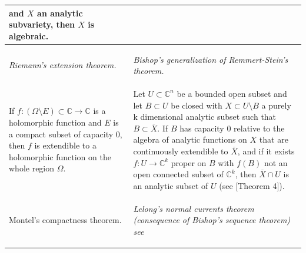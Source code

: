 \documentclass[12pt,twoside,a4paper]{report}
\newcommand{\co}{\ensuremath{\mathbb C }}
\newcommand{\con}{\ensuremath{\mathbb{C}^n}}
\newcommand{\om}{\ensuremath{\Omega}}
\begin{document}
\begin{table}[h!]
\begin{tabular}{| m{5cm} | m{5cm} |}
                                  and $X$ an analytic subvariety, then $X$ is algebraic.\\
                              \midrule
                              \begin{center}
                                  \textit{Riemann's extension theorem.}
                              \end{center}
                                  &
                              \begin{center}
                                  \textit{Bishop's generalization of Remmert-Stein's theorem.}
                              \end{center} \\
                              \midrule
                                  If $f:(\om\setminus E)\subset\co\rightarrow\co$ is a holomorphic function and
                                  $E$ is a compact subset of capacity $0$, then $f$ is extendible to a holomorphic
                                  function on the whole region $\om$.
                                          &
                                  Let $U\subset\con$ be a bounded open
                                  subset and let $B\subset U$ be closed with $X\subset U\setminus B$ a purely k
                                  dimensional analytic subset such that $B\subset\overline{X}$. If $B$ has
                                  capacity $0$ relative to the algebra of analytic functions on $X$ that are
                                  continuously extendible to $\overline{X}$, and if it exists
                                  $f:U\rightarrow\co^k$ proper on $B$ with $f(B)$ not an open connected subset of
                                  $\co^k$, then $\overline{X}\cap U$ is an analytic subset of $U$
                                  (see \cite{Bishop}[Theorem 4]).\\
                              \midrule
                              \begin{center}
                                      Montel's compactness theorem.
                              \end{center}
                                          &
                              \begin{center}
                              \textit{Lelong's normal currents theorem (consequence of Bishop's sequence theorem) see \cite{Lelong}}

\end{center}
\end{tabular}
\end{table}
\end{document}
